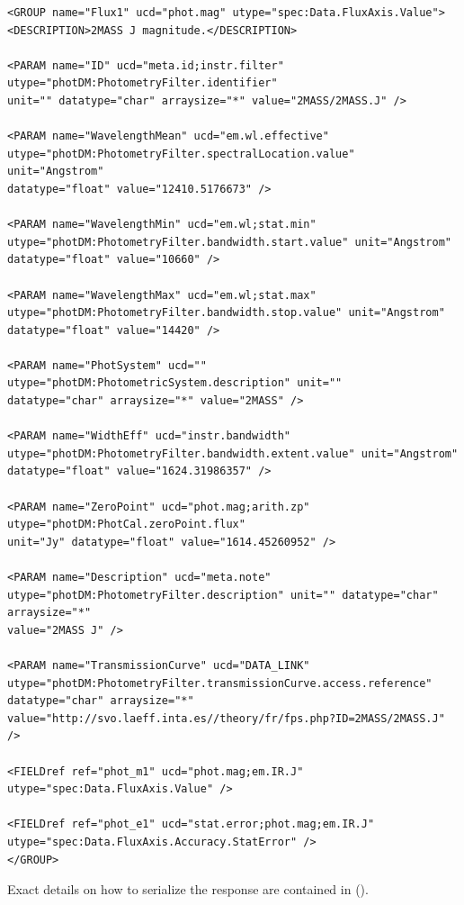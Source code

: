 \documentclass[11pt,a4paper]{ivoa}
\begin{document}
\begin{verbatim}
<GROUP name="Flux1" ucd="phot.mag" utype="spec:Data.FluxAxis.Value">
<DESCRIPTION>2MASS J magnitude.</DESCRIPTION>

<PARAM name="ID" ucd="meta.id;instr.filter" 
utype="photDM:PhotometryFilter.identifier"
unit="" datatype="char" arraysize="*" value="2MASS/2MASS.J" />

<PARAM name="WavelengthMean" ucd="em.wl.effective"
utype="photDM:PhotometryFilter.spectralLocation.value"
unit="Angstrom"
datatype="float" value="12410.5176673" />

<PARAM name="WavelengthMin" ucd="em.wl;stat.min"
utype="photDM:PhotometryFilter.bandwidth.start.value" unit="Angstrom"
datatype="float" value="10660" />

<PARAM name="WavelengthMax" ucd="em.wl;stat.max"
utype="photDM:PhotometryFilter.bandwidth.stop.value" unit="Angstrom"
datatype="float" value="14420" />

<PARAM name="PhotSystem" ucd="" utype="photDM:PhotometricSystem.description" unit=""
datatype="char" arraysize="*" value="2MASS" />

<PARAM name="WidthEff" ucd="instr.bandwidth"
utype="photDM:PhotometryFilter.bandwidth.extent.value" unit="Angstrom"
datatype="float" value="1624.31986357" />

<PARAM name="ZeroPoint" ucd="phot.mag;arith.zp" utype="photDM:PhotCal.zeroPoint.flux"
unit="Jy" datatype="float" value="1614.45260952" />

<PARAM name="Description" ucd="meta.note"
utype="photDM:PhotometryFilter.description" unit="" datatype="char" arraysize="*"
value="2MASS J" />

<PARAM name="TransmissionCurve" ucd="DATA_LINK"
utype="photDM:PhotometryFilter.transmissionCurve.access.reference" 
datatype="char" arraysize="*"
value="http://svo.laeff.inta.es//theory/fr/fps.php?ID=2MASS/2MASS.J" />

<FIELDref ref="phot_m1" ucd="phot.mag;em.IR.J"
utype="spec:Data.FluxAxis.Value" />

<FIELDref ref="phot_e1" ucd="stat.error;phot.mag;em.IR.J"
utype="spec:Data.FluxAxis.Accuracy.StatError" />
</GROUP>

\end{verbatim}



\vspace{\baselineskip}
Exact details on how to serialize the response are contained in (\cite{derriere}).
\par

\par


\end{document}
